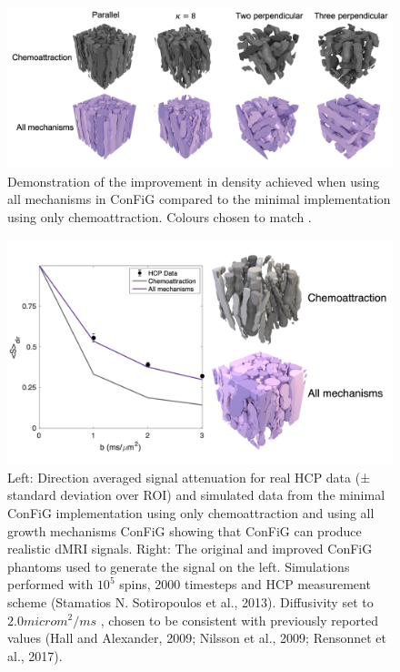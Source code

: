 \begin{figure}
  \centering
  \includegraphics[width=\textwidth]{figures/config/improvement_3drender.png}
  \caption[Impact of biological mechanisms on 3D phantoms]{Demonstration of the improvement in density achieved when using all mechanisms in ConFiG compared to the minimal implementation using only chemoattraction. Colours chosen to match . }
  \label{fig:config_res_improvements_3d}
\end{figure}

\begin{figure}
  \centering
  \includegraphics[width=\textwidth]{figures/config/hcp_old_vs_new_figure_whitebg.png}
  \caption[Impact of improvements on simulated dMRI signal]{Left: Direction averaged signal attenuation for real HCP data (± standard deviation over ROI) and simulated data from the minimal ConFiG implementation using only chemoattraction and using all growth mechanisms ConFiG showing that ConFiG can produce realistic dMRI signals. Right: The original and improved ConFiG phantoms used to generate the signal on the left. Simulations performed with $10^5$ spins, 2000 timesteps and HCP measurement scheme (Stamatios N. Sotiropoulos et al., 2013). Diffusivity set to $2.0microm ^2/ms$ , chosen to be consistent with previously reported values (Hall and Alexander, 2009; Nilsson et al., 2009; Rensonnet et al., 2017).  }
  \label{fig:config_res_improvements_sig}
\end{figure}

